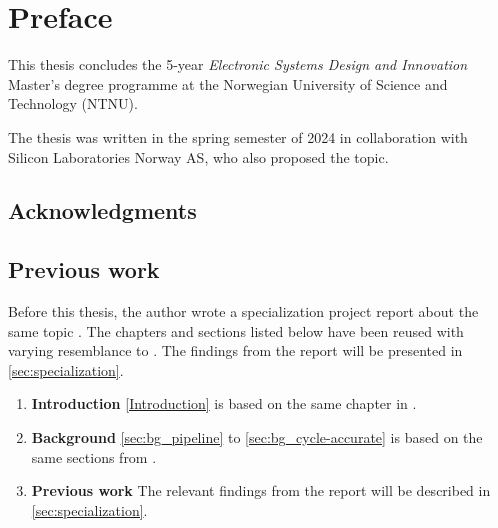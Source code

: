 \chapter*{Preface}


This thesis concludes the 5-year \textit{Electronic Systems Design and Innovation} Master's degree programme at the Norwegian University of Science and Technology (NTNU).  

The thesis was written in the spring semester of 2024 in collaboration with Silicon Laboratories Norway AS, who also proposed the topic.


\section*{Acknowledgments}

%
%
%


\section*{Previous work}

Before this thesis, the author wrote a specialization project report about the same topic \cite{torjenygaardeikenesDesigningRISCVReference2023}. The chapters and sections listed below have been reused with varying resemblance to \cite{torjenygaardeikenesDesigningRISCVReference2023}. The findings from the report will be presented in \cref{sec:specialization}.


\begin{enumerate}
    \item \textbf{Introduction} \cref{Introduction} is based on the same chapter in \cite{torjenygaardeikenesDesigningRISCVReference2023}.
    \item \textbf{Background} \cref{sec:bg_pipeline} to \cref{sec:bg_cycle-accurate} is based on the same sections from \cite{torjenygaardeikenesDesigningRISCVReference2023}.
    \item \textbf{Previous work} The relevant findings from the report will be described in \cref{sec:specialization}.
\end{enumerate}


